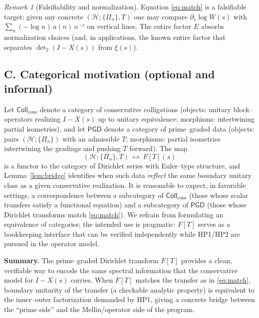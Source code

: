 \documentclass[11pt]{article}
\numberwithin{equation}{section}
\theoremstyle{definition}
\theoremstyle{remark}
\newtheorem{remark}[theorem]{Remark}
\newcommand{\1}{\mathbbm{1}}
\begin{document}
\begin{remark}[Falsifiability and normalization]
Equation \eqref{eq:match} is a falsifiable target: given any concrete $(\mathcal H;\{\Pi_n\},T)$ one may compare $\partial_s\log W(s)$ with $\sum_n (-\log n)\,a(n)\,n^{-s}$ on vertical lines. The entire factor $E$ absorbs normalization choices (and, in applications, the known entire factor that separates $\det_2(I-X(s))$ from $\xi(s)$).
\end{remark}

\subsection*{C. Categorical motivation (optional and informal)}
Let $\mathsf{Coll}_{\mathrm{cons}}$ denote a category of conservative colligations (objects: unitary block–operators realizing $I-X(s)$ up to unitary equivalence; morphisms: intertwining partial isometries), and let $\mathsf{PGD}$ denote a category of prime–graded data (objects: pairs $(\mathcal H;\{\Pi_n\})$ with an admissible $T$; morphisms: partial isometries intertwining the gradings and pushing $T$ forward). The map
\[
(\mathcal H;\{\Pi_n\},T)\ \longmapsto\ F[T](s)
\]
is a functor to the category of Dirichlet series with Euler–type structure, and Lemma~\ref{lem:bridge} identifies when such data \emph{reflect} the same boundary unitary class as a given conservative realization. It is reasonable to expect, in favorable settings, a correspondence between a subcategory of $\mathsf{Coll}_{\mathrm{cons}}$ (those whose scalar transfers satisfy a functional equation) and a subcategory of $\mathsf{PGD}$ (those whose Dirichlet transforms match \eqref{eq:match}). We refrain from formulating an equivalence of categories; the intended use is pragmatic: $F[T]$ serves as a bookkeeping interface that can be verified independently while HP1/HP2 are pursued in the operator model.

\medskip
\noindent\textbf{Summary.} The prime–graded Dirichlet transform $F[T]$ provides a clean, verifiable way to encode the same spectral information that the conservative model for $I-X(s)$ carries. When $F[T]$ matches the transfer as in \eqref{eq:match}, boundary unitarity of the transfer (a checkable analytic property) is equivalent to the inner–outer factorization demanded by HP1, giving a concrete bridge between the “prime side” and the Mellin/operator side of the program.


\nocite{*}


\end{document}
